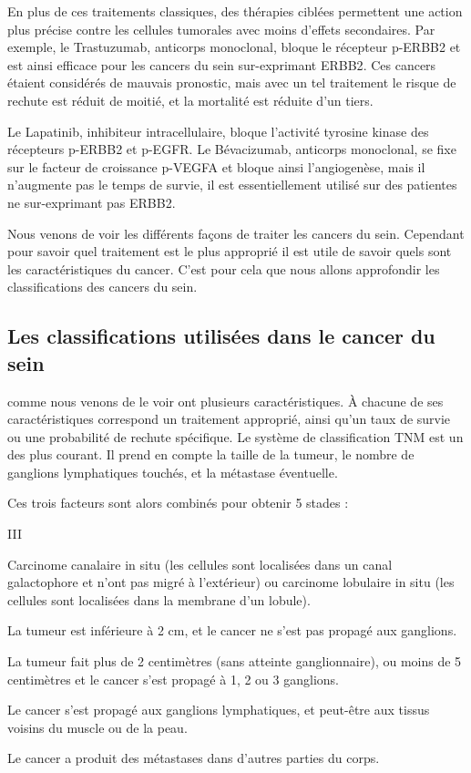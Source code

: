       En plus de ces traitements classiques, des thérapies ciblées permettent une action plus précise contre les cellules tumorales avec moins d'effets secondaires.
      Par exemple, le Trastuzumab, anticorps monoclonal, bloque le récepteur \acs{p-ERBB2} et est ainsi efficace pour les cancers du sein sur-exprimant \acs{ERBB2}.
      Ces cancers étaient considérés de mauvais pronostic, mais avec un tel traitement le risque de rechute est réduit de moitié, et la mortalité est réduite d'un tiers.

      Le Lapatinib, inhibiteur intracellulaire, bloque l'activité tyrosine kinase des récepteurs \acs{p-ERBB2} et \acs{p-EGFR}.
      Le Bévacizumab, anticorps monoclonal, se fixe sur le facteur de croissance \acs{p-VEGFA} et bloque ainsi l'angiogenèse, mais il n'augmente pas le temps de survie, il est essentiellement utilisé sur des patientes ne sur-exprimant pas \acs{ERBB2}.

      Nous venons de voir les différents façons de traiter les cancers du sein.
      Cependant pour savoir quel traitement est le plus approprié il est utile de savoir quels sont les caractéristiques du cancer.
      C'est pour cela que nous allons approfondir les classifications des cancers du sein.

    \subsection{\textcolor{myred}{Les classifications utilisées dans le cancer du sein}}
       comme nous venons de le voir ont plusieurs caractéristiques.
      À chacune de ses caractéristiques correspond un traitement approprié, ainsi qu'un taux de survie ou une probabilité de rechute spécifique.
      Le système de classification \ac{TNM} est un des plus courant.
      Il prend en compte la taille de la tumeur, le nombre de ganglions lymphatiques touchés, et la métastase éventuelle.

      Ces trois facteurs sont alors combinés pour obtenir 5 stades :
      \begin{mylist}{III}
        \item [0]   Carcinome canalaire in situ (les cellules sont localisées dans un canal galactophore et n'ont pas migré à l'extérieur) ou carcinome lobulaire in situ (les cellules sont localisées dans la membrane d'un lobule).
        \item [I]   La tumeur est inférieure à 2 cm, et le cancer ne s'est pas propagé aux ganglions.
        \item [II]  La tumeur fait plus de 2 centimètres (sans atteinte ganglionnaire), ou moins de 5 centimètres et le cancer s'est propagé à 1, 2 ou 3 ganglions.
        \item [III] Le cancer s'est propagé aux ganglions lymphatiques, et peut-être aux tissus voisins du muscle ou de la peau.
        \item [IV]  Le cancer a produit des métastases dans d'autres parties du corps.
      \end{mylist}
      \vspace{1.5em}

